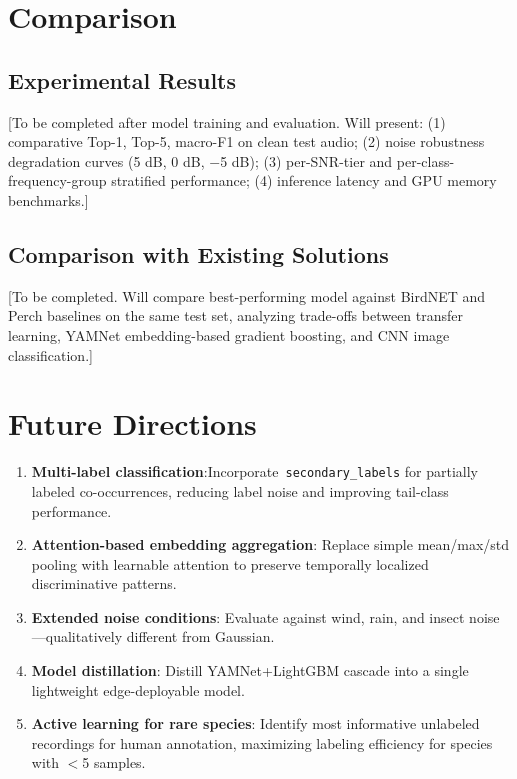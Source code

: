 \documentclass[conference]{IEEEtran}
\begin{document}
\section{Comparison}

\subsection{Experimental Results}

[To be completed after model training and evaluation. Will present: (1) comparative Top-1, Top-5, macro-F1 on clean test audio; (2) noise robustness degradation curves (5 dB, 0 dB, $-$5 dB); (3) per-SNR-tier and per-class-frequency-group stratified performance; (4) inference latency and GPU memory benchmarks.]

\subsection{Comparison with Existing Solutions}

[To be completed. Will compare best-performing model against BirdNET and Perch baselines on the same test set, analyzing trade-offs between transfer learning, YAMNet embedding-based gradient boosting, and CNN image classification.]


\section{Future Directions}

\begin{enumerate}
    \item \textbf{Multi-label classification}:\linebreak[0] Incorporate~\texttt{secondary\_\allowbreak labels} for partially labeled co-occurrences, reducing label noise and improving tail-class performance.
    \item \textbf{Attention-based embedding aggregation}: Replace simple mean/max/std pooling with learnable attention to preserve temporally localized discriminative patterns.
    \item \textbf{Extended noise conditions}: Evaluate against wind, rain, and insect noise—qualitatively different from Gaussian.
    \item \textbf{Model distillation}: Distill YAMNet+LightGBM cascade into a single lightweight edge-deployable model.
    \item \textbf{Active learning for rare species}: Identify most informative unlabeled recordings for human annotation, maximizing labeling efficiency for species with $<$5 samples.
\end{enumerate}
\end{document}
